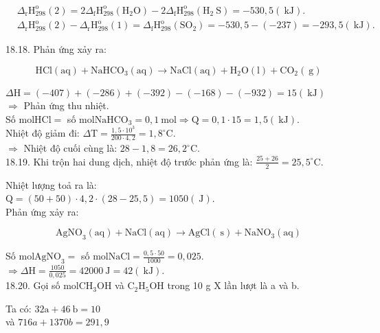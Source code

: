 \documentclass[10pt]{article}
\begin{document}
$$
\begin{aligned}
& \Delta_{\mathrm{r}} \mathrm{H}_{298}^{\mathrm{o}}(2)=2 \Delta_{\mathrm{f}} \mathrm{H}_{298}^{\mathrm{o}}\left(\mathrm{H}_{2} \mathrm{O}\right)-2 \Delta_{\mathrm{f}} \mathrm{H}_{298}^{\mathrm{o}}\left(\mathrm{H}_{2} \mathrm{~S}\right)=-530,5(\mathrm{~kJ}) . \\
& \Delta_{\mathrm{r}} \mathrm{H}_{298}^{\mathrm{o}}(2)-\Delta_{\mathrm{r}} \mathrm{H}_{298}^{\mathrm{o}}(1)=\Delta_{\mathrm{f}} \mathrm{H}_{298}^{\mathrm{o}}\left(\mathrm{SO}_{2}\right)=-530,5-(-237)=-293,5(\mathrm{~kJ}) .
\end{aligned}
$$

18.18. Phản ứng xảy ra:

$$
\mathrm{HCl}(\mathrm{aq})+\mathrm{NaHCO}_{3}(\mathrm{aq}) \rightarrow \mathrm{NaCl}(\mathrm{aq})+\mathrm{H}_{2} \mathrm{O}(\mathrm{l})+\mathrm{CO}_{2}(\mathrm{~g})
$$

$\Delta \mathrm{H}=(-407)+(-286)+(-392)-(-168)-(-932)=15(\mathrm{~kJ})$\\
$\Rightarrow$ Phản ứng thu nhiệt.\\
Số $\mathrm{mol} \mathrm{HCl}=$ số $\mathrm{mol} \mathrm{NaHCO}_{3}=0,1 \mathrm{~mol} \Rightarrow \mathrm{Q}=0,1 \cdot 15=1,5(\mathrm{~kJ})$.\\
Nhiệt độ giảm đi: $\Delta \mathrm{T}=\frac{1,5 \cdot 10^{3}}{200 \cdot 4,2}=1,8^{\circ} \mathrm{C}$.\\
$\Rightarrow$ Nhiệt độ cuối cùng là: $28-1,8=26,2^{\circ} \mathrm{C}$.\\
18.19. Khi trộn hai dung dịch, nhiệt độ trước phản ứng là: $\frac{25+26}{2}=25,5^{\circ} \mathrm{C}$.

Nhiệt lượng toả ra là:\\
$\mathrm{Q}=(50+50) \cdot 4,2 \cdot(28-25,5)=1050(\mathrm{~J})$.\\
Phản ứng xảy ra:

$$
\mathrm{AgNO}_{3}(\mathrm{aq})+\mathrm{NaCl}(\mathrm{aq}) \rightarrow \mathrm{AgCl}(\mathrm{~s})+\mathrm{NaNO}_{3}(\mathrm{aq})
$$

Số $\mathrm{mol} \mathrm{AgNO}_{3}=$ số $\mathrm{mol} \mathrm{NaCl}=\frac{0,5 \cdot 50}{1000}=0,025$.\\
$\Rightarrow \Delta \mathrm{H}=\frac{1050}{0,025}=42000 \mathrm{~J}=42(\mathrm{~kJ})$.\\
18.20. Gọi số $\mathrm{mol} \mathrm{CH}_{3} \mathrm{OH}$ và $\mathrm{C}_{2} \mathrm{H}_{5} \mathrm{OH}$ trong 10 g X lần lượt là a và b.

Ta có: $32 \mathrm{a}+46 \mathrm{~b}=10$\\
và $716 a+1370 b=291,9$
\end{document}
